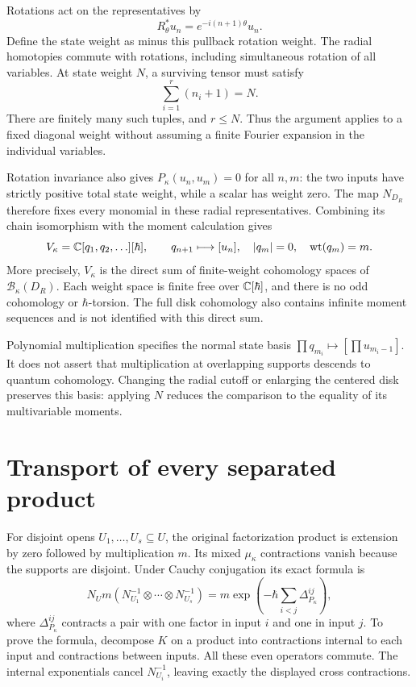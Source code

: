 Rotations act on the representatives by
\[
 R_\theta^*u_n=e^{-i(n+1)\theta}u_n.
\]
Define the state weight as minus this pullback rotation weight.
The radial homotopies commute with rotations, including simultaneous
rotation of all variables.  At state weight $N$, a surviving tensor
must satisfy
\[
 \sum_{i=1}^r(n_i+1)=N.
\]
There are finitely many such tuples, and $r\le N$.  Thus the argument
applies to a fixed diagonal weight without assuming a finite Fourier
expansion in the individual variables.

Rotation invariance also gives $P_\kappa(u_n,u_m)=0$ for all $n,m$:
the two inputs have strictly positive total state weight, while a
scalar has weight zero.  The map $N_{D_R}$ therefore fixes every
monomial in these radial representatives.  Combining its chain
isomorphism with the moment calculation gives
\[
 V_\kappa=\mathbb C[q_1,q_2,\ldots][\hbar],\qquad
 q_{n+1}\longmapsto[u_n],\quad
 |q_m|=0,\quad\mathrm{wt}(q_m)=m.
\]
More precisely, $V_\kappa$ is the direct sum of finite-weight
cohomology spaces of $\mathcal B_\kappa(D_R)$.  Each weight space is
finite free over $\mathbb C[\hbar]$, and there is no odd cohomology or
$\hbar$-torsion.  The full disk cohomology also contains infinite
moment sequences and is not identified with this direct sum.

Polynomial multiplication specifies the normal state basis
$\prod q_{m_i}\mapsto[\prod u_{m_i-1}]$.  It does not assert that
multiplication at overlapping supports descends to quantum
cohomology.  Changing the radial cutoff or enlarging the centered
disk preserves this basis: applying $N$ reduces the comparison to
the equality of its multivariable moments.

\section{Transport of every separated product}

For disjoint opens $U_1,\ldots,U_s\subseteq U$, the original
factorization product is extension by zero followed by multiplication
$m$.  Its mixed $\mu_\kappa$ contractions vanish because the supports
are disjoint.  Under Cauchy conjugation its exact formula is
\[
 N_Um(N_{U_1}^{-1}\otimes\cdots\otimes N_{U_s}^{-1})
   =m\exp\left(-\hbar\sum_{i<j}\Delta_{P_\kappa}^{ij}\right),
\]
where $\Delta_{P_\kappa}^{ij}$ contracts a pair with one factor in
input $i$ and one in input $j$.  To prove the formula, decompose $K$
on a product into contractions internal to each input and contractions
between inputs.  All these even operators commute.  The internal
exponentials cancel $N_{U_i}^{-1}$, leaving exactly the displayed
cross contractions.

